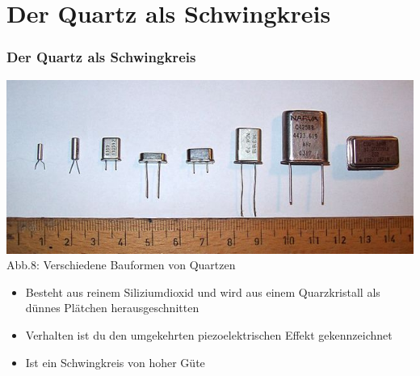 \section*{Der Quartz als Schwingkreis}
\begin{frame}
\frametitle{Der Quartz als Schwingkreis}
\begin{center}
	\includegraphics[scale=0.3]{a04/Quartz.jpg}\\
	Abb.8: Verschiedene Bauformen von Quartzen
\end{center}
\begin{itemize}
	\item	Besteht aus reinem Siliziumdioxid und wird aus einem Quarzkristall als dünnes Plätchen herausgeschnitten
	\item	Verhalten ist du den umgekehrten piezoelektrischen Effekt gekennzeichnet
	\item	Ist ein Schwingkreis von hoher Güte
\end{itemize}
\end{frame}

